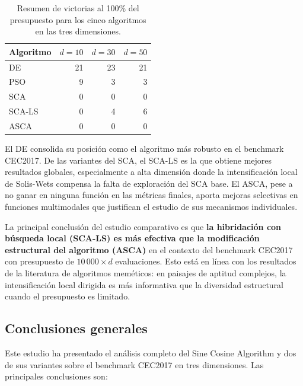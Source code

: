 \documentclass[12pt,a4paper]{article}
\begin{document}
\begin{table}[H]
\centering
\caption{Resumen de victorias al 100\% del presupuesto para los cinco algoritmos en las tres dimensiones.}
\label{tab:comparativa_final}
\renewcommand{\arraystretch}{1.2}
\begin{tabular}{lrrr}
\toprule
\textbf{Algoritmo} & $d=10$ & $d=30$ & $d=50$ \\
\midrule
DE     & 21 & 23 & 21 \\
PSO    &  9 &  3 &  3 \\
SCA    &  0 &  0 &  0 \\
SCA-LS &  0 &  4 &  6 \\
ASCA   &  0 &  0 &  0 \\
\bottomrule
\end{tabular}
\end{table}
El DE consolida su posición como el algoritmo más robusto en el benchmark CEC2017. De las variantes del SCA, el SCA-LS es la que obtiene mejores resultados globales, especialmente a alta dimensión donde la intensificación local de Solis-Wets compensa la falta de exploración del SCA base. El ASCA, pese a no ganar en ninguna función en las métricas finales, aporta mejoras selectivas en funciones multimodales que justifican el estudio de sus mecanismos individuales.

La principal conclusión del estudio comparativo es que \textbf{la hibridación con búsqueda local (SCA-LS) es más efectiva que la modificación estructural del algoritmo (ASCA)} en el contexto del benchmark CEC2017 con presupuesto de $10\,000 \times d$ evaluaciones. Esto está en línea con los resultados de la literatura de algoritmos meméticos: en paisajes de aptitud complejos, la intensificación local dirigida es más informativa que la diversidad estructural cuando el presupuesto es limitado.

\subsection{Conclusiones generales}

Este estudio ha presentado el análisis completo del Sine Cosine Algorithm y dos de sus variantes sobre el benchmark CEC2017 en tres dimensiones. Las principales conclusiones son:
\end{document}
